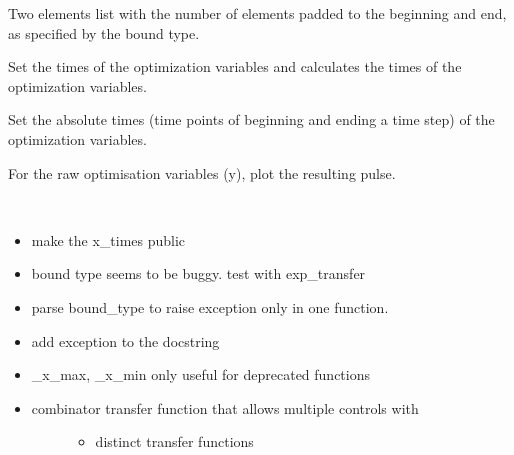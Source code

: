 \documentclass[letterpaper,10pt,english]{sphinxmanual}
\begin{document}
\begin{fulllineitems}
\begin{fulllineitems}
Two elements list with the number of elements padded to the beginning
and end, as specified by the bound type.

\end{fulllineitems}



\begin{fulllineitems}
Set the times of the optimization variables and calculates the times
of the optimization variables.

\end{fulllineitems}



\begin{fulllineitems}
Set the absolute times (time points of beginning and ending a time
step) of the optimization variables.

\end{fulllineitems}



\begin{fulllineitems}
For the raw optimisation variables (y), plot the resulting pulse.

\end{fulllineitems}



\begin{fulllineitems}
~\begin{itemize}
\item {} 
make the x\_times public

\item {} 
bound type seems to be buggy. test with exp\_transfer

\item {} 
parse bound\_type to raise exception only in one function.

\item {} 
add exception to the docstring

\item {} 
\_x\_max, \_x\_min only useful for deprecated functions

\item {} \begin{description}
\item[{combinator transfer function that allows multiple controls with}] \leavevmode\begin{itemize}
\item {} 
distinct transfer functions


\end{itemize}
\end{description}
\end{itemize}
\end{fulllineitems}
\end{fulllineitems}
\end{document}
